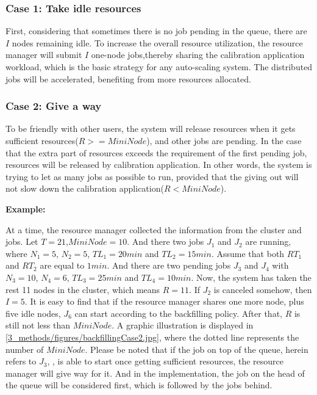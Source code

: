 \subsubsection{Case 1: Take idle resources}
First, considering that sometimes there is no job pending in the queue, there are $I$ nodes remaining idle.
To increase the overall resource utilization, the resource manager will submit $I$ one-node jobs,thereby sharing the calibration application workload, which is the basic strategy for any auto-scaling system. 
The distributed jobs will be accelerated, benefiting from more resources allocated.

\subsubsection{Case 2: Give a way}
To be friendly with other users, the system will release resources when it gets sufficient resources($R>=MiniNode$), and other jobs are pending.
In the case that the extra part of resources exceeds the requirement of the first pending job, resources will be released by calibration application.
In other words, the system is trying to let as many jobs as possible to run, provided that the giving out will not slow down the calibration application($R<MiniNode$).

\textbf{Example:}

At a time, the resource manager collected the information from the cluster and jobs.
Let $T=21$,$MiniNode=10$. And there two jobs $J_{1}$ and $J_{2}$ are running, where $N_{1}=5$, $N_{2}=5$, $TL_{1}=20 min$ and $TL_{2}=15 min$.
Assume that both $RT_{1}$ and $RT_{2}$ are equal to $1 min$. And there are two pending jobs $J_{3}$ and $J_{4}$ with  $N_{3}=10$, $N_{4}=6$, $TL_{3}=25 min$ and $TL_{4}=10 min$.
Now, the system has taken the rest 11 nodes in the cluster, which means $R=11$.
If $J_{2}$ is canceled somehow, then $I=5$. It is easy to find that if the resource manager shares one more node, plus five idle nodes, $J_{6}$ can start according to the backfilling policy. 
After that, $R$ is still not less than $MiniNode$. A graphic illustration is displayed in \ref{3_methods/figures/backfillingCase2.jpg}, where the dotted line represents the number of $MiniNode$. 
Please be noted that if the job on top of the queue, herein refers to  $J_{3}$, , is able to start once getting sufficient resources, the resource manager will give way for it. And in the implementation, the job on the head of the queue will be considered first, which is followed by the jobs behind.

